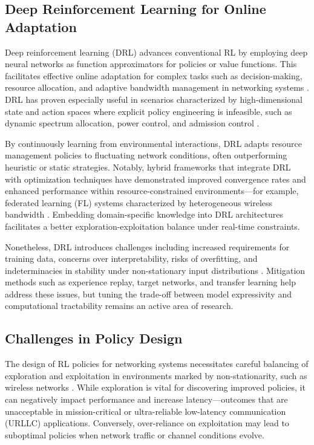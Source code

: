\documentclass[sigconf]{acmart}
\begin{document}
\subsection{Deep Reinforcement Learning for Online Adaptation}

Deep reinforcement learning (DRL) advances conventional RL by employing deep neural networks as function approximators for policies or value functions. This facilitates effective online adaptation for complex tasks such as decision-making, resource allocation, and adaptive bandwidth management in networking systems \cite{ref4,ref8,ref13,ref15,ref50}. DRL has proven especially useful in scenarios characterized by high-dimensional state and action spaces where explicit policy engineering is infeasible, such as dynamic spectrum allocation, power control, and admission control \cite{ref4,ref8}.

By continuously learning from environmental interactions, DRL adapts resource management policies to fluctuating network conditions, often outperforming heuristic or static strategies. Notably, hybrid frameworks that integrate DRL with optimization techniques have demonstrated improved convergence rates and enhanced performance within resource-constrained environments—for example, federated learning (FL) systems characterized by heterogeneous wireless bandwidth \cite{ref50}. Embedding domain-specific knowledge into DRL architectures facilitates a better exploration-exploitation balance under real-time constraints.

Nonetheless, DRL introduces challenges including increased requirements for training data, concerns over interpretability, risks of overfitting, and indeterminacies in stability under non-stationary input distributions \cite{ref13}. Mitigation methods such as experience replay, target networks, and transfer learning help address these issues, but tuning the trade-off between model expressivity and computational tractability remains an active area of research.

\subsection{Challenges in Policy Design}

The design of RL policies for networking systems necessitates careful balancing of exploration and exploitation in environments marked by non-stationarity, such as wireless networks \cite{ref3,ref6,ref14,ref48}. While exploration is vital for discovering improved policies, it can negatively impact performance and increase latency—outcomes that are unacceptable in mission-critical or ultra-reliable low-latency communication (URLLC) applications. Conversely, over-reliance on exploitation may lead to suboptimal policies when network traffic or channel conditions evolve.
\end{document}
